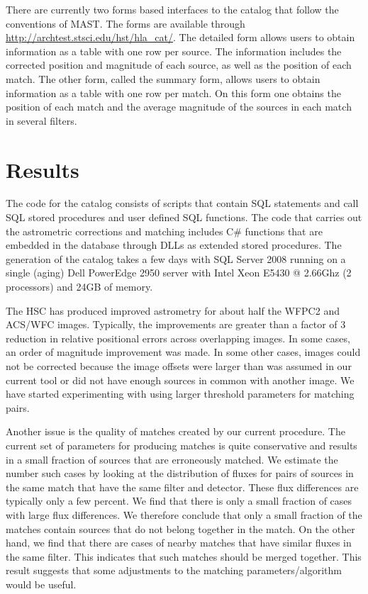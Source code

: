 There are currently two forms based interfaces to the catalog that follow the conventions of MAST. The forms are available through \url{http://archtest.stsci.edu/hst/hla_cat/}. The detailed form allows users to obtain information as a table with one row per source. The information includes the corrected position and magnitude of each source, as well as the position of each match. The other form, called the summary form, allows users to obtain information as a table with one row per match. On this form one obtains the position of each match and the average magnitude of the sources in each match in several filters.

\section{Results}


The code for the catalog consists  of scripts that contain SQL statements and call SQL stored procedures and user defined SQL functions. The code that carries out the astrometric corrections and matching includes  C\# functions that are embedded in the database through DLLs as extended stored procedures. The generation of the catalog takes a few days  with SQL Server 2008 running on a single (aging) Dell PowerEdge 2950 server with  Intel Xeon E5430 @ 2.66Ghz (2 processors) and 24GB of memory.

The HSC has produced improved astrometry for about half the WFPC2 and ACS/WFC images. Typically, the improvements are greater than a factor of 3 reduction in relative positional errors across overlapping images. In some cases, an order of magnitude improvement was made. In some other cases, images could not be corrected because the image offsets were larger than was assumed in our current tool or did not have enough sources in common  with another image. We have started experimenting with using larger threshold parameters for matching pairs.

Another issue is the quality of matches created by our current procedure. The current set of parameters for producing matches is quite conservative and results in a small fraction of sources that are erroneously matched. We estimate the number such cases by looking at the distribution of fluxes for pairs of sources in the same match that have the same filter and detector. These flux differences are typically only a few percent. We find that there is only a small fraction of cases with large flux differences.  We therefore conclude that only a small fraction of the matches contain sources that do not belong together in the match. On the other hand, we find that there are cases of nearby matches that have similar fluxes in the same filter. This indicates that such matches should be merged together. This result suggests that some adjustments to the matching parameters/algorithm would be useful.

